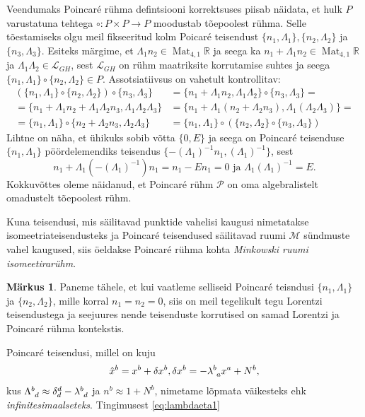 \documentclass[a4paper,12pt]{article}
\theoremstyle{plain}
\theoremstyle{definition}
\newtheorem{markus}{Märkus}[section]
\numberwithin{equation}{section}
\def\R{{\mathbb R}}
\def\L{{\mathcal L}}
\def\M{{\mathcal M}}
\def\P{{\mathcal P}}
\DeclareMathOperator{\Mat}{Mat}
\begin{document}
Veendumaks Poincar\'e rühma defintsiooni korrektsuses piisab näidata, et hulk $P$ varustatuna tehtega $\circ : P \times P \rightarrow P$ moodustab tõepoolest rühma.
Selle tõestamiseks olgu meil fikseeritud kolm Poicar\'e teisendust $\{n_1, \Lambda_1\}, \{n_2, \Lambda_2\}$ ja $\{n_3, \Lambda_3\}$. Esiteks märgime, et $ \Lambda_1 n_2 \in \Mat_{4, 1}\R$ ja seega ka $n_1 + \Lambda_1 n_2 \in \Mat_{4, 1}\R$ ja $\Lambda_1 \Lambda_2 \in \L_{GH}$, sest $\L_{GH}$ on rühm maatriksite korrutamise suhtes ja seega $\{n_1, \Lambda_1\} \circ \{n_2, \Lambda_2\} \in P$.
Assotsiatiivsus on vahetult kontrollitav:
\begin{align*}
\left(\{n_1, \Lambda_1\} \circ \{n_2, \Lambda_2\}\right) \circ \{n_3, \Lambda_3\} &= \{n_1 + \Lambda_1 n_2, \Lambda_1 \Lambda_2 \} \circ \{n_3, \Lambda_3 \} = \\
= \{n_1 + \Lambda_1 n_2 + \Lambda_1 \Lambda_2 n_3, \Lambda_1 \Lambda_2 \Lambda_3 \} &= \{n_1 + \Lambda_1 \left( n_2 + \Lambda_2 n_3 \right), \Lambda_1 \left( \Lambda_2 \Lambda_3 \right)\} = \\
= \{n_1, \Lambda_1 \} \circ \{n_2 + \Lambda_2 n_3, \Lambda_2 \Lambda_3 \} &= \{n_1, \Lambda_1\} \circ \left( \{n_2, \Lambda_2\} \circ \{n_3, \Lambda_3\} \right)
\end{align*}
Lihtne on näha, et ühikuks sobib võtta $\{0, E\}$ ja seega on Poincar\'e teisenduse $\{n_1, \Lambda_1\}$ pöördelemendiks teisendus $\{ -\left(\Lambda_1\right)^{-1} n_1, \left(\Lambda_1\right)^{-1} \}$, sest
\[ n_1 + \Lambda_1 \left(-\left(\Lambda_1\right)^{-1}\right) n_1 = n_1 - E n_1 = 0 \text{ ja } \Lambda_1 \left(\Lambda_1\right)^{-1} = E. \]
Kokkuvõttes oleme näidanud, et Poincar\'e rühm $\P$ on oma algebralistelt omadustelt tõepoolest rühm.

Kuna teisendusi, mis säilitavad punktide vahelisi kaugusi nimetatakse isomeetriateisendusteks ja Poincar\'e teisendused säilitavad ruumi $\M$ sündmuste vahel kaugused, siis öeldakse Poincar\'e rühma kohta \emph{Minkowski ruumi isomeetirarühm}.

\begin{markus}
Paneme tähele, et kui vaatleme selliseid Poincar\'e teisndusi $\{n_1, \Lambda_1\}$ ja $\{n_2, \Lambda_2\}$, mille korral $n_1 = n_2 = 0$, siis on meil tegelikult tegu Lorentzi teisendustega ja seejuures nende teisenduste korrutised on samad Lorentzi ja Poincar\'e rühma kontekstis.
\end{markus}

Poincar\'e teisendusi, millel on kuju
\begin{align*}
\hat{x}^b = x^b + \delta x^b, \delta x^b = - \lambda\indices{^b_a} x^a + N^b,
\end{align*}
kus $\Lambda\indices{^b_d} \approx \delta^d_d - \lambda\indices{^b_d}$ ja $n^b \approx1 + N^b$, nimetame lõpmata väikesteks ehk \emph{infinitesimaalseteks}. 
Tingimusest \ref{eq:lambdaeta1}
\end{document}
